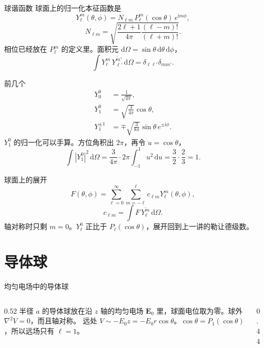 \documentclass[fontset=windows, chinese, 10pt, xcolor=dvipsnames]{beamer}
\begin{document}
\begin{frame}{球谐函数}
  球面上的归一化本征函数是
  \begin{equation*}
    \boxed{\displaystyle
      Y_{\ell}^{m}(\theta,\phi)
      =N_{\ell m}\,P_{\ell}^{m}(\cos\theta)\,e^{\mathrm{i}m\phi},}
  \end{equation*}
  \[
    N_{\ell m}
    =\sqrt{\frac{2\ell+1}{4\pi}\frac{(\ell-m)!}{(\ell+m)!}}.
  \]
  相位已经放在 $P_{\ell}^{m}$ 的定义里。面积元 $\mathrm{d}\Omega=\sin\theta\,\mathrm{d}\theta\,\mathrm{d}\phi$，
  \[
    \int Y_{\ell}^{m}\,\overline{Y_{\ell'}^{m'}}\,\mathrm{d}\Omega
    =\delta_{\ell\ell'}\delta_{mm'}.
  \]
\end{frame}

\begin{frame}{前几个}
  \begin{align*}
    Y_0^{0}&=\frac{1}{\sqrt{4\pi}},\\
    Y_1^{0}&=\sqrt{\frac{3}{4\pi}}\cos\theta,\\
    Y_1^{\pm 1}&=\mp\sqrt{\frac{3}{8\pi}}\sin\theta\,e^{\pm\mathrm{i}\phi}.
  \end{align*}
  $Y_1^{0}$ 的归一化可以手算。方位角积出 $2\pi$，再令 $u=\cos\theta$，
  \[
    \int|Y_1^{0}|^2\,\mathrm{d}\Omega
    =\frac{3}{4\pi}\cdot 2\pi\int_{-1}^{1}u^2\,\mathrm{d}u
    =\frac32\cdot\frac23=1.
  \]
\end{frame}

\begin{frame}{球面上的展开}
  \[
    F(\theta,\phi)
    =\sum_{\ell=0}^{\infty}\sum_{m=-\ell}^{\ell}
      c_{\ell m}Y_{\ell}^{m}(\theta,\phi),
  \]
  \[
    c_{\ell m}=\int F\,\overline{Y_{\ell}^{m}}\,\mathrm{d}\Omega.
  \]
  轴对称时只剩 $m=0$。$Y_{\ell}^{0}$ 正比于 $P_{\ell}(\cos\theta)$，展开回到上一讲的勒让德级数。
\end{frame}

\section{导体球}

\begin{frame}{均匀电场中的导体球}
  \begin{columns}[c]
    \begin{column}{0.52\textwidth}
      半径 $a$ 的导体球放在沿 $z$ 轴的均匀电场 $\mathbf{E}_0$ 里，球面电位取为零。球外 $\nabla^2 V=0$，而且轴对称。
      \vspace{0.4em}
      远处 $V\sim -E_0 z=-E_0 r\cos\theta$。$\cos\theta=P_1(\cos\theta)$，所以远场只有 $\ell=1$。
    \end{column}
    \begin{column}{0.44\textwidth}
      \centering
      \scalebox{0.78}{}
    \end{column}
  \end{columns}
\end{frame}
\end{document}
